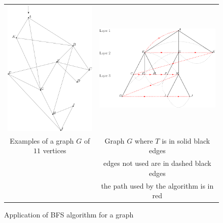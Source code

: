\documentclass[a4paper,11pt]{article}
\theoremstyle{plain}
\theoremstyle{definition}
\theoremstyle{remark}
\begin{document}
\begin{figure}
\centering
\caption{Application of BFS algorithm for a graph}
\begin{tabular}{cc}
\label{tab:bfs_graph}
    \includegraphics[scale=0.5]{graph} & \includegraphics[scale=0.35]{treegraph} \\
Examples of a graph $G$ of $11$ vertices & Graph $G$ where $T$ is in solid black edges \\
& edges not used are in dashed black edges \\
& the path used by the algorithm is in red
\end{tabular}
\end{figure}
\end{document}
